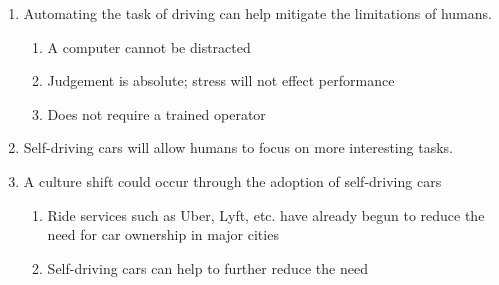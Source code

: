 \documentclass{mla}
\begin{document}
\begin{enumerate}
	\item Automating the task of driving can help mitigate the limitations of humans.
	\begin{enumerate}
	    \item A computer cannot be distracted
	    \item Judgement is absolute; stress will not effect performance
	    \item Does not require a trained operator
	\end{enumerate}
	
	\item Self-driving cars will allow humans to focus on more interesting tasks.
	
	\item A culture shift could occur through the adoption of self-driving cars
	\begin{enumerate}
	    \item Ride services such as Uber, Lyft, etc. have already begun to reduce the need for car ownership in major cities
	    \item Self-driving cars can help to further reduce the need
	\end{enumerate}
\end{enumerate}
\end{document}
